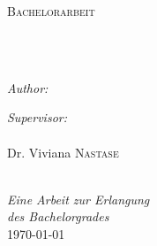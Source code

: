 \documentclass[
captions=nooneline,
11pt, %
ngerman, %
singlespacing, %
headsepline, %
]{MastersDoctoralThesis} %
\author{Dennis \textsc{Ulmer}} %
\begin{document}
\frontmatter %

\pagestyle{plain} %


\begin{titlepage}
\begin{center}

{\scshape\LARGE \univname\par}\vspace{1.5cm} %
\textsc{\Large Bachelorarbeit}\\[0.5cm] %

\HRule \\[0.4cm] %
{\huge \bfseries \ttitle\par}\vspace{0.4cm} %
\HRule \\[1.5cm] %

\begin{minipage}[t]{0.4\textwidth}
\begin{flushleft} \large
\emph{Author:}\\
{\authorname} %
\end{flushleft}
\end{minipage}
\begin{minipage}[t]{0.4\textwidth}
\begin{flushright} \large
\emph{Supervisor:} \\
{\supname\\Dr. Viviana \textsc{Nastase}} %
\end{flushright}
\end{minipage}\\[3cm]

\large \textit{Eine Arbeit zur Erlangung \\ des Bachelorgrades}\\[0.3cm] %

{\large \today}\\[4cm] %

\vfill
\end{center}
\end{titlepage}
\end{document}

